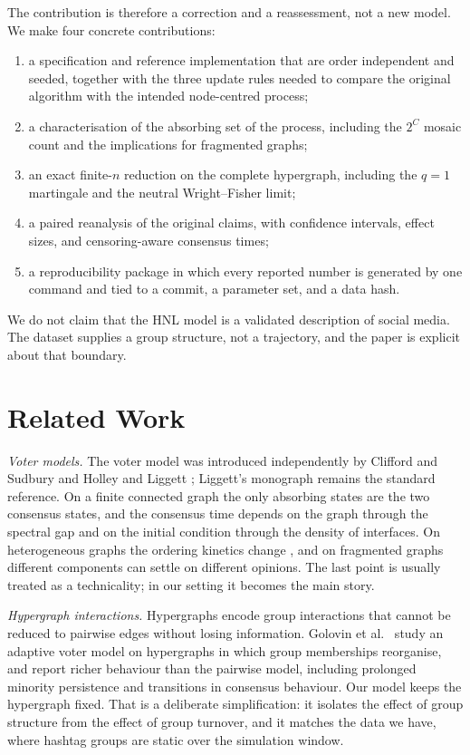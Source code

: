 \documentclass[conference]{IEEEtran}
\begin{document}
The contribution is therefore a correction and a reassessment, not a new model. We make four concrete contributions:
\begin{enumerate}
\item a specification and reference implementation that are order independent and seeded, together with the three update rules needed to compare the original algorithm with the intended node-centred process;
\item a characterisation of the absorbing set of the process, including the $2^{C}$ mosaic count and the implications for fragmented graphs;
\item an exact finite-$n$ reduction on the complete hypergraph, including the $q=1$ martingale and the neutral Wright--Fisher limit;
\item a paired reanalysis of the original claims, with confidence intervals, effect sizes, and censoring-aware consensus times;
\item a reproducibility package in which every reported number is generated by one command and tied to a commit, a parameter set, and a data hash.
\end{enumerate}
We do not claim that the HNL model is a validated description of social media. The dataset supplies a group structure, not a trajectory, and the paper is explicit about that boundary.

\section{Related Work}

\emph{Voter models.} The voter model was introduced independently by Clifford and Sudbury \cite{clifford1973} and Holley and Liggett \cite{holley1975}; Liggett's monograph \cite{liggett1999} remains the standard reference. On a finite connected graph the only absorbing states are the two consensus states, and the consensus time depends on the graph through the spectral gap and on the initial condition through the density of interfaces. On heterogeneous graphs the ordering kinetics change \cite{sood2005}, and on fragmented graphs different components can settle on different opinions. The last point is usually treated as a technicality; in our setting it becomes the main story.

\emph{Hypergraph interactions.} Hypergraphs encode group interactions that cannot be reduced to pairwise edges without losing information. Golovin et al.\ \cite{golovin2023} study an adaptive voter model on hypergraphs in which group memberships reorganise, and report richer behaviour than the pairwise model, including prolonged minority persistence and transitions in consensus behaviour. Our model keeps the hypergraph fixed. That is a deliberate simplification: it isolates the effect of group structure from the effect of group turnover, and it matches the data we have, where hashtag groups are static over the simulation window.
\end{document}
